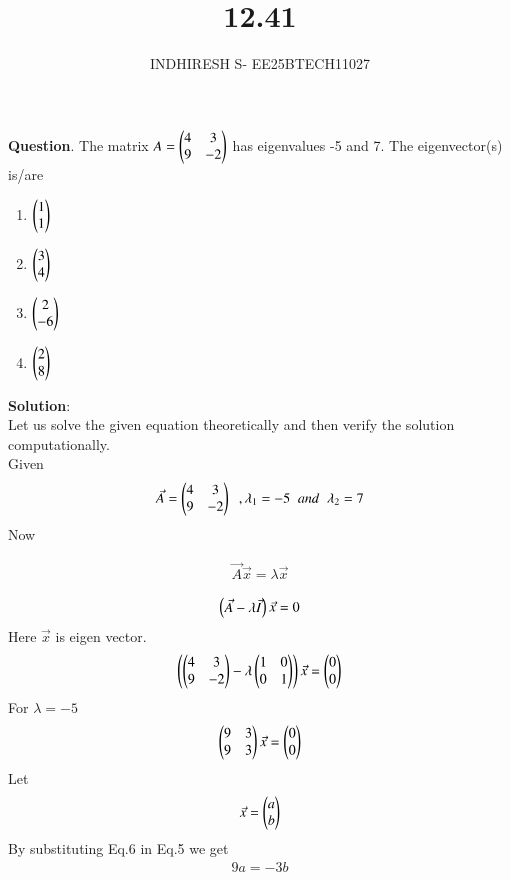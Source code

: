 \documentclass[journal]{IEEEtran}
\theoremstyle{remark}
\begin{document}

\onecolumn

\title{12.41}
\author{INDHIRESH S- EE25BTECH11027}
\maketitle


\renewcommand{\thefigure}{\theenumi}
\renewcommand{\thetable}{\theenumi}

\textbf{Question}. The matrix $A =\begin{pmatrix}4&3\\9&-2\end{pmatrix}$ has eigenvalues -5 and 7. The eigenvector(s) is/are
\begin{multicols}{2}
\begin{enumerate}
    \item $\begin{pmatrix}1\\1\end{pmatrix}$
    \item $\begin{pmatrix}3\\4\end{pmatrix}$
    \item $\begin{pmatrix}2\\-6\end{pmatrix}$
    \item $\begin{pmatrix}2\\8\end{pmatrix}$
\end{enumerate}
\end{multicols}
\textbf{Solution}:\\
Let us solve the given equation theoretically and then verify the solution computationally. \\
Given
\begin{align}
 \Vec{A} =\begin{pmatrix}4&3\\9&-2\end{pmatrix}\;\;,\lambda_1=-5\;\;and\;\;\lambda_2=7
\end{align}
Now 

\begin{align}
  \Vec{A}\Vec{x}=\lambda\Vec{x}
\end{align}

\begin{align}
\begin{pmatrix}\Vec{A}-\lambda\Vec{I}\end{pmatrix}\Vec{x}=0
\end{align}
Here $\Vec{x}$ is eigen vector.
\begin{align}
\begin{pmatrix}\begin{pmatrix}4&3\\9&-2\end{pmatrix}-\lambda\begin{pmatrix}1&0\\0&1\end{pmatrix}\end{pmatrix}\Vec{x}=\begin{pmatrix}0\\0\end{pmatrix}
\end{align}
For  $\lambda=-5$
\begin{align}
 \begin{pmatrix}9&3\\9&3\end{pmatrix}\Vec{x}=\begin{pmatrix}0\\0\end{pmatrix}
\end{align}
Let 
\begin{align}
   \Vec{x}=\begin{pmatrix}a\\b\end{pmatrix}
\end{align}
By substituting Eq.6 in Eq.5 we get
\begin{align}
  9a=-3b
\end{align}
\end{document}
